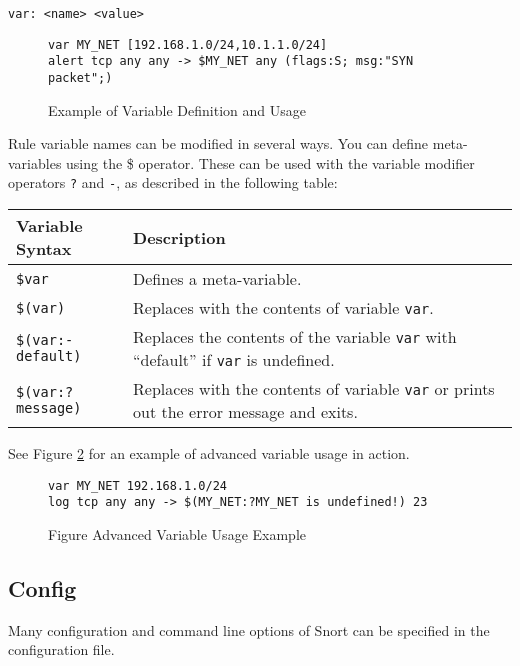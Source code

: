 \documentclass[english]{report}
\begin{document}
\begin{verbatim}
var: <name> <value>
\end{verbatim}

\begin{figure}[!hbpt]
\begin{verbatim}
var MY_NET [192.168.1.0/24,10.1.1.0/24]
alert tcp any any -> $MY_NET any (flags:S; msg:"SYN packet";)
\end{verbatim}

\caption{Example of Variable Definition and Usage\label{variable definition}}
\end{figure}

Rule variable names can be modified in several ways. You can define
meta-variables using the \$ operator. These can be used with the variable
modifier operators {\tt ?}  and {\tt -}, as described in the following table: 

\begin{tabular}{| l | p{5in} |}
\hline
\textbf{Variable Syntax} & \textbf{Description}\\
\hline
\hline
\texttt{\$var} & Defines a meta-variable.\\
\hline
\texttt{\$(var)} & Replaces with the contents of variable \texttt{var}.\\
\hline
\texttt{\$(var:-default)} & Replaces the contents of the variable \texttt{var} with ``default'' if 
   \texttt{var} is undefined.\\
\hline
\texttt{\$(var:?message)} & Replaces with the contents of variable \texttt{var} or prints out the
error message and exits.\\
\hline
\end{tabular}


See Figure \ref{advanced variable usage} for an example of advanced variable usage in action.

\begin{figure}[!hbpt]
\begin{verbatim}
var MY_NET 192.168.1.0/24
log tcp any any -> $(MY_NET:?MY_NET is undefined!) 23
\end{verbatim}

\caption{Figure Advanced Variable Usage Example\label{advanced variable usage}}
\end{figure}

\subsection{Config}

Many configuration and command line options of Snort can be specified
in the configuration file. 
\end{document}
